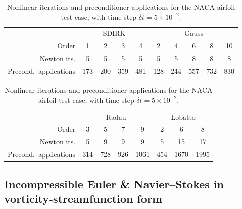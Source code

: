\documentclass[review]{siamart}
\begin{document}
\begin{table}
	\centering
	\caption{Nonlinear iterations and preconditioner applications for the NACA airfoil test case, with time step $\delta t = 5 \times 10^{-2}.$}
	\label{tab:naca-iters}
	\begin{tabular}{r|cccc|ccccc}
		\toprule
		& \multicolumn{4}{c|}{SDIRK} & \multicolumn{5}{c}{Gauss} \\
		Order  & 1 & 2 & 3 & 4 & 2 & 4 & 6 & 8 & 10\\
		\midrule
		Newton its. & 5 & 5 & 5 & 5 & 5 & 5 & 8 & 8 & 8\\
		\midrule
		Precond.\ applications & 173 & 200 & 359 & 481 & 128 & 244 & 557 & 732 & 830\\
		\bottomrule
	\end{tabular}

	\vspace{\floatsep}

	\begin{tabular}{r|cccc|ccc}
		\toprule
		& \multicolumn{4}{c|}{Radau} & \multicolumn{3}{c}{Lobatto} \\
		Order  & 3 & 5 & 7 & 9 & 2 & 6 & 8\\
		\midrule
		Newton its. & 5 & 9 & 9 & 9 & 5 & 15 & 17\\
		\midrule
		Precond.\ applications & 314 & 728 & 926 & 1061 & 454 & 1670 & 1995\\
		\bottomrule
	\end{tabular}
\end{table}

\subsection{Incompressible Euler \& Navier--Stokes in vorticity-streamfunction form}
\label{sec:numerics:khi}
\end{document}
